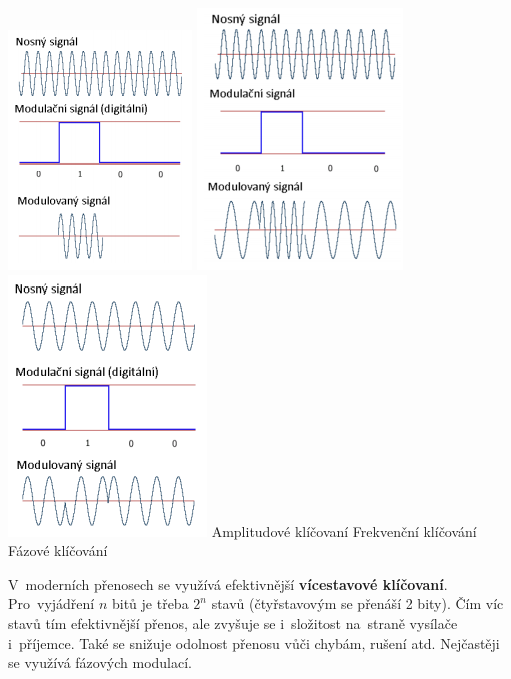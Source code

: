 \includegraphics[scale=0.75]{images/-019.png}
\includegraphics[scale=0.75]{images/-020.png}
\includegraphics[scale=0.75]{images/-021.png}
Amplitudové klíčovaní \hspace{2cm} Frekvenční klíčování \hspace{2cm} Fázové klíčování

V~moderních přenosech se využívá efektivnější \textbf{vícestavové klíčovaní}. Pro~vyjádření $n$ bitů je třeba $2^n$ stavů (čtyřstavovým se přenáší 2 bity). Čím víc stavů tím efektivnější přenos, ale zvyšuje se i~složitost na~straně vysílače i~příjemce. Také se snižuje odolnost přenosu vůči chybám, rušení atd. Nejčastěji se využívá fázových modulací.

